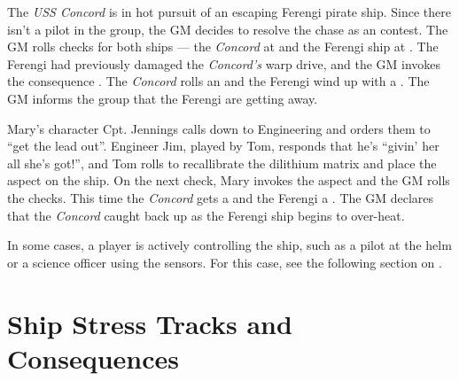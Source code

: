 \documentclass[12pt,titlepage,openany]{book}
\begin{document}
\begin{example}
    The \emph{USS Concord} is in hot pursuit of an escaping Ferengi pirate
    ship. Since there isn't a pilot in the group, the GM decides to resolve the
    chase as an  contest. The GM rolls  checks
    for both ships --- the \emph{Concord} at  and the Ferengi ship
    at . The Ferengi had previously damaged the \emph{Concord's}
    warp drive, and the GM invokes the consequence . The \emph{Concord} rolls an  and the Ferengi wind up
    with a . The GM informs the group that the Ferengi are getting
    away.

    Mary's character Cpt. Jennings calls down to Engineering and orders them to
    ``get the lead out''. Engineer Jim, played by Tom, responds that he's
    ``givin' her all she's got!'', and Tom rolls  to
    recallibrate the dilithium matrix and place the aspect  on the ship. On the next  check, Mary invokes the
    aspect and the GM rolls the checks. This time the \emph{Concord} gets a
     and the Ferengi a . The GM declares that the
    \emph{Concord} caught back up as the Ferengi ship begins to over-heat.
\end{example}

In some cases, a player is actively controlling the ship, such as a pilot at
the helm or a science officer using the sensors. For this case, see the
following section on .

\section{Ship Stress Tracks and Consequences}\label{sec:ship-stress}
\end{document}

